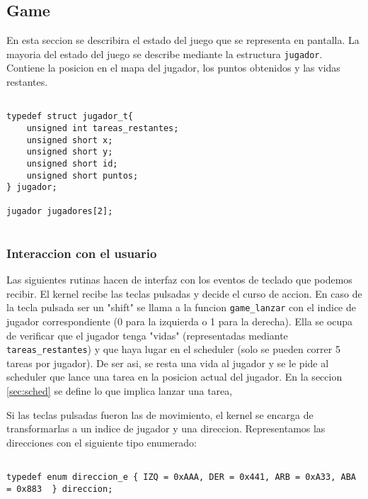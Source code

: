 
\subsection{Game}

\label{sec:game}

En esta seccion se describira el estado del juego que se representa en pantalla.
La mayoria del estado del juego se describe mediante la estructura \verb|jugador|. Contiene la posicion en el mapa del jugador, los puntos obtenidos y las vidas restantes.



\begin{verbatim}

typedef struct jugador_t{
	unsigned int tareas_restantes;
	unsigned short x;
	unsigned short y;
	unsigned short id;
	unsigned short puntos;
} jugador;

jugador jugadores[2];


\end{verbatim}


\subsubsection{Interaccion con el usuario}


Las siguientes rutinas hacen de interfaz con los eventos de teclado que podemos recibir. El kernel recibe las teclas pulsadas y decide el curso de accion. 
En caso de la tecla pulsada ser un "shift" se llama a la funcion \verb|game_lanzar| con el indice de jugador correspondiente (0 para la izquierda o 1 para la derecha). Ella se ocupa de verificar que el jugador tenga "vidas" (representadas mediante \verb|tareas_restantes|) y que haya lugar en el scheduler (solo se pueden correr 5 tareas por jugador). De ser asi, se resta una vida al jugador y se le pide al scheduler que lance una tarea en la posicion actual del jugador. En la seccion \ref{sec:sched} se define lo que implica lanzar una tarea,

Si las teclas pulsadas fueron las de movimiento, el kernel se encarga de transformarlas a un indice de jugador y una direccion. Representamos las direcciones con el siguiente tipo enumerado:

\begin{verbatim}

typedef enum direccion_e { IZQ = 0xAAA, DER = 0x441, ARB = 0xA33, ABA = 0x883  } direccion;

\end{verbatim}


